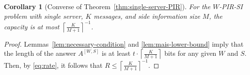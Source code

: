 \documentclass[letterpaper, 10 pt, conference]{ieeeconf}
\newcommand\salim[1]{\add[salim]{#1}}
\newtheorem{corollary}{Corollary}
\begin{document}
\begin{corollary}[Converse of Theorem~\ref{thm:single-server-PIR}]
For the $W$-PIR-SI problem with single server, $K$ messages, and side information size $M$, the capacity is at most ${\left\lceil \frac{K}{M+1} \right\rceil}^{-1}$.
\end{corollary}
\begin{proof}
Lemmas~\ref{lem:necessary-condition} and \ref{lem:mais-lower-bound} imply that the length of the answer $A^{[W,S]}$ is at least $t\cdot{\left\lceil \frac{K}{M+1} \right\rceil}$ bits %
for any given $W$ and $S$. Then, by \eqref{eq:rate}, it follows that $R\leq  \left\lceil \frac{K}{M+1} \right\rceil^{-1}$. 	
\end{proof}
\end{document}
